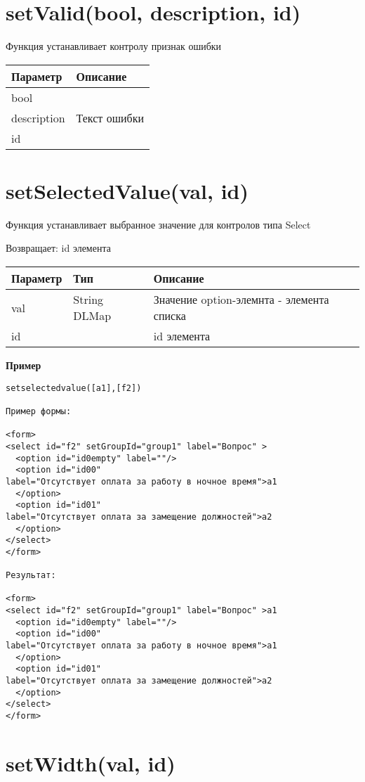 \hypertarget{setvalidbool-description-id}{%
\section{setValid(bool, description,
id)}\label{setvalidbool-description-id}}

Функция устанавливает контролу признак ошибки


\begin{longtable}[]{@{}ll@{}}
\toprule
Параметр & Описание\tabularnewline
\midrule
\endhead
bool &\tabularnewline
description & Текст ошибки\tabularnewline
id &\tabularnewline
\bottomrule
\end{longtable}

\hypertarget{setselectedvalueval-id}{%
\section{setSelectedValue(val, id)}\label{setselectedvalueval-id}}

Функция устанавливает выбранное значение для контролов типа Select

Возвращает: id элемента

\begin{longtable}[]{@{}lll@{}}
\toprule
Параметр & Тип & Описание\tabularnewline
\midrule
\endhead
val & String \textbar{} DLMap & Значение option-элемнта - элемента
списка\tabularnewline
id & & id элемента\tabularnewline
\bottomrule
\end{longtable}

\textbf{Пример}

\begin{verbatim}
setselectedvalue([a1],[f2])

Пример формы:

<form>
<select id="f2" setGroupId="group1" label="Вопрос" >
  <option id="id0empty" label=""/>
  <option id="id00" 
label="Отсутствует оплата за работу в ночное время">a1
  </option>
  <option id="id01" 
label="Отсутствует оплата за замещение должностей">a2
  </option>
</select>
</form>

Результат:

<form>
<select id="f2" setGroupId="group1" label="Вопрос" >a1
  <option id="id0empty" label=""/>
  <option id="id00" 
label="Отсутствует оплата за работу в ночное время">a1
  </option>
  <option id="id01" 
label="Отсутствует оплата за замещение должностей">a2
  </option>
</select>
</form>
\end{verbatim}

\hypertarget{setwidthval-id}{%
\section{setWidth(val, id)}\label{setwidthval-id}}

